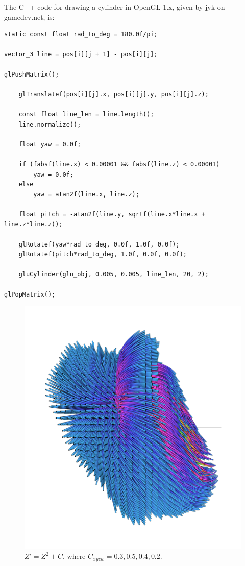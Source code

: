 \documentclass[12pt]{article}
\begin{document}
The C++ code for drawing a cylinder in OpenGL 1.x, given by jyk on gamedev.net, is:
\begin{lstlisting}
static const float rad_to_deg = 180.0f/pi;

vector_3 line = pos[i][j + 1] - pos[i][j];
			
glPushMatrix();

	glTranslatef(pos[i][j].x, pos[i][j].y, pos[i][j].z);

	const float line_len = line.length();
	line.normalize();
			
	float yaw = 0.0f;

	if (fabsf(line.x) < 0.00001 && fabsf(line.z) < 0.00001)
		yaw = 0.0f;
	else
		yaw = atan2f(line.x, line.z);

	float pitch = -atan2f(line.y, sqrtf(line.x*line.x + line.z*line.z));

	glRotatef(yaw*rad_to_deg, 0.0f, 1.0f, 0.0f);
	glRotatef(pitch*rad_to_deg, 1.0f, 0.0f, 0.0f);

	gluCylinder(glu_obj, 0.005, 0.005, line_len, 20, 2);

glPopMatrix();
\end{lstlisting}



\begin{figure} 
  \includegraphics[width=\textwidth]{1.png}	
  \caption{$Z' = Z^2 + C$, where $C_{xyzw} = 0.3, 0.5, 0.4, 0.2$.}
\end{figure}
\end{document}
